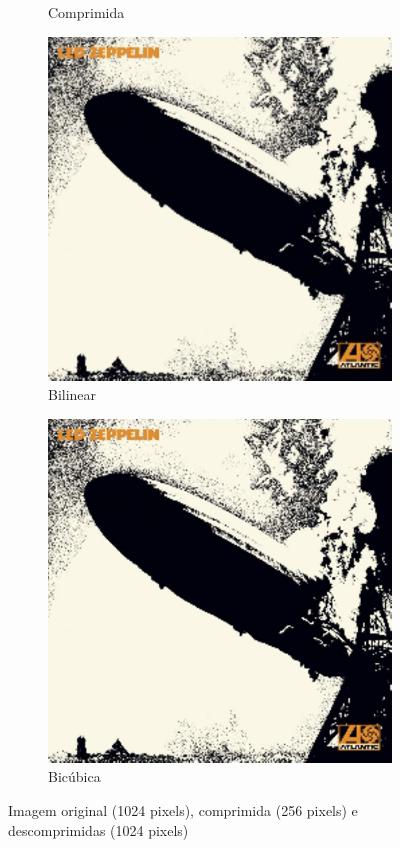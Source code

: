 \documentclass{article}
\begin{document}
\begin{figure}[ht]
\begin{subfigure}{0.48\textwidth}
    \caption{Comprimida}
  \end{subfigure}%
  \hfill
  \begin{subfigure}{0.48\textwidth}
    \centering
    \includegraphics[width=\textwidth]{imagens-reais/led-zeppelin-1/decompressed-bilinear.png}
    \caption{Bilinear}
  \end{subfigure}%
  \hfill
  \begin{subfigure}{0.48\textwidth}
    \centering
    \includegraphics[width=\textwidth]{imagens-reais/led-zeppelin-1/decompressed-bicubica.png}
    \caption{Bicúbica}
  \end{subfigure}
  \caption{Imagem original (1024 pixels), comprimida (256 pixels) e descomprimidas (1024 pixels)}
\end{figure}
\end{document}
